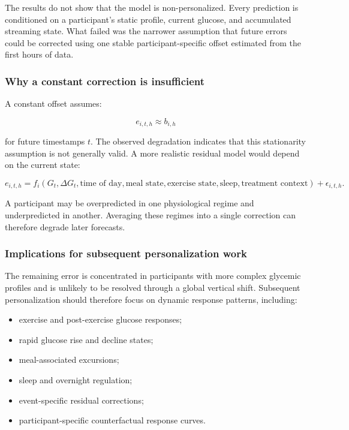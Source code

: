 The results do not show that the model is non-personalized. Every prediction is
conditioned on a participant's static profile, current glucose, and accumulated
streaming state. What failed was the narrower assumption that future errors
could be corrected using one stable participant-specific offset estimated from
the first hours of data.

\subsubsection{Why a constant correction is insufficient}

A constant offset assumes:

\begin{equation}
e_{i,t,h}
\approx
b_{i,h}
\end{equation}

for future timestamps $t$. The observed degradation indicates that this
stationarity assumption is not generally valid. A more realistic residual model
would depend on the current state:

\begin{equation}
e_{i,t,h}
=
f_i
\left(
G_t,
\Delta G_t,
\text{time of day},
\text{meal state},
\text{exercise state},
\text{sleep},
\text{treatment context}
\right)
+
\epsilon_{i,t,h}.
\end{equation}

A participant may be overpredicted in one physiological regime and
underpredicted in another. Averaging these regimes into a single correction can
therefore degrade later forecasts.

\subsubsection{Implications for subsequent personalization work}

The remaining error is concentrated in participants with more complex glycemic
profiles and is unlikely to be resolved through a global vertical shift.
Subsequent personalization should therefore focus on dynamic response patterns,
including:

\begin{itemize}
    \item exercise and post-exercise glucose responses;
    \item rapid glucose rise and decline states;
    \item meal-associated excursions;
    \item sleep and overnight regulation;
    \item event-specific residual corrections;
    \item participant-specific counterfactual response curves.
\end{itemize}

